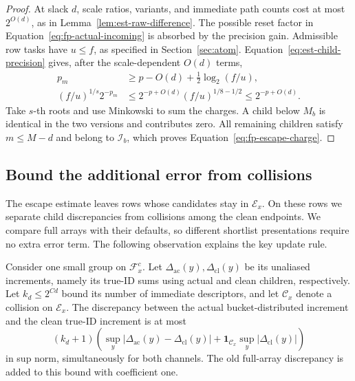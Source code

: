 \begin{proof}
At slack $d$, scale ratios, variants, and immediate path counts cost at
most $2^{O(d)}$, as in Lemma~\ref{lem:est-raw-difference}.  The possible
reset factor in Equation~\eqref{eq:fp-actual-incoming} is absorbed by the
precision gain.  Admissible row tasks have $u\le f$, as specified in
Section~\ref{sec:atom}.  Equation~\eqref{eq:est-child-precision} gives,
after the scale-dependent $O(d)$ terms,
\begin{align*}
 p_m&\ge p-O(d)+\tfrac12\log_2(f/u),\\
 (f/u)^{1/s}2^{-p_m}
 &\le 2^{-p+O(d)}(f/u)^{1/8-1/2}
 \le 2^{-p+O(d)}.
\end{align*}
Take $s$-th roots and use Minkowski to sum the charges.  A child below
$M_b$ is identical in the two versions and contributes zero.  All
remaining children satisfy $m\le M-d$ and belong to $\mathcal I_b$,
which proves Equation~\eqref{eq:fp-escape-charge}.
\end{proof}

\subsection{Bound the additional error from collisions}

The escape estimate leaves rows whose candidates stay in
$\mathcal E_x$.  On these rows we separate child discrepancies from
collisions among the clean endpoints.  We compare full arrays with
their defaults, so different shortlist presentations require no extra
error term.  The following observation explains the key update rule.

\begin{lemma}\label{lem:fp-buckets}
Consider one small group on $\mathcal F_x^c$.  Let
$\Delta_{\mathrm{ac}}(y),\Delta_{\mathrm{cl}}(y)$ be its unaliased
increments, namely its true-ID sums using actual and clean children,
respectively.  Let $k_d\le2^{C d}$ bound its number of immediate
descriptors, and let $\mathcal C_x$ denote a collision on $\mathcal E_x$.
The discrepancy between the actual bucket-distributed increment and
the clean true-ID increment is at most
\begin{equation}
 (k_d+1)\left(
       \sup_y|\Delta_{\mathrm{ac}}(y)-\Delta_{\mathrm{cl}}(y)|
       +\mathbf1_{\mathcal C_x}\sup_y|\Delta_{\mathrm{cl}}(y)|
                  \right)
 \label{eq:fp-bucket-bound}
\end{equation}
in sup norm, simultaneously for both channels.  The old full-array
discrepancy is added to this bound with coefficient one.
\end{lemma}

